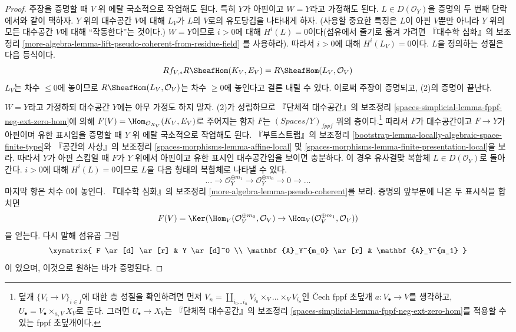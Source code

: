 \begin{proof}
\medskip\noindent
주장을 증명할 때 $V$ 위 에탈 국소적으로 작업해도 된다. 특히 $Y$가 아핀이고
$W = Y$라고 가정해도 된다. $L \in D(\mathcal{O}_Y)$을 증명의 두 번째 단락에서와
같이 택하자. $Y$ 위의 대수공간 $V$에 대해 $L_V$가 $L$의 $V$로의 유도당김을
나타내게 하자. (사용할 중요한 특징은 $L$이 아핀 $V$뿐만 아니라 $Y$ 위의
모든 대수공간 $V$에 대해 ``작동한다''는 것이다.) $W = Y$이므로
$i > 0$에 대해 $H^i(L) = 0$이다(섬유에서 줄기로 옮겨 가려면 『대수학 심화』의
보조정리
\ref{more-algebra-lemma-lift-pseudo-coherent-from-residue-field}
를 사용하라). 따라서 $i > 0$에 대해 $H^i(L_V) = 0$이다. $L$을 정의하는
성질은 다음 등식이다.
$$
Rf_{V, *}R\SheafHom(K_V, E_V) = R\SheafHom(L_V, \mathcal{O}_V)
$$
$L_V$는 차수 $\leq 0$에 놓이므로
$R\SheafHom(L_V, \mathcal{O}_V)$는 차수 $\geq 0$에 놓인다고 결론 내릴 수 있다.
이로써 주장이 증명되고, (2)의 증명이 끝난다.

\medskip\noindent
$W = Y$라고 가정하되 대수공간 $Y$에는 아무 가정도 하지 말자. (2)가
성립하므로 『단체적 대수공간』의 보조정리
\ref{spaces-simplicial-lemma-fppf-neg-ext-zero-hom}에 의해
$F(V) = \Hom_{\mathcal{O}_{X_V}}(K_V, E_V)$로 주어지는 함자 $F$는
$(\textit{Spaces}/Y)_{fppf}$ 위의 층이다.\footnote{덮개
$\{V_i \to V\}_{i \in I}$에 대한 층 성질을 확인하려면 먼저
$V_n = \coprod_{i_0 \ldots i_n} V_{i_0} \times_V \ldots \times_V V_{i_n}$인
{\v C}ech fppf 초덮개 $a : V_\bullet \to V$를 생각하고,
$U_\bullet = V_\bullet \times_{a, V} X_V$로 둔다. 그러면
$U_\bullet \to X_V$는 『단체적 대수공간』의 보조정리
\ref{spaces-simplicial-lemma-fppf-neg-ext-zero-hom}를 적용할 수 있는 fppf
초덮개이다.} 따라서 $F$가 대수공간이고 $F \to Y$가 아핀이며 유한 표시임을
증명할 때 $Y$ 위 에탈 국소적으로 작업해도 된다. 『부트스트랩』의 보조정리
\ref{bootstrap-lemma-locally-algebraic-space-finite-type}와 『공간의 사상』의
보조정리 \ref{spaces-morphisms-lemma-affine-local} 및
\ref{spaces-morphisms-lemma-finite-presentation-local}을 보라. 따라서 $Y$가
아핀 스킴일 때 $F$가 $Y$ 위에서 아핀이고 유한 표시인 대수공간임을 보이면
충분하다. 이 경우 유사결맞 복합체 $L \in D(\mathcal{O}_Y)$로 돌아간다.
$i > 0$에 대해 $H^i(L) = 0$이므로 $L$을 다음 형태의 복합체로 나타낼 수 있다.
$$
\ldots \to \mathcal{O}_Y^{\oplus m_1} \to \mathcal{O}_Y^{\oplus m_0}
\to 0 \to \ldots
$$
마지막 항은 차수 $0$에 놓인다. 『대수학 심화』의 보조정리
\ref{more-algebra-lemma-pseudo-coherent}를 보라. 증명의 앞부분에 나온 두
표시식을 합치면
$$
F(V) =
\Ker(
\Hom_V(\mathcal{O}_V^{\oplus m_0}, \mathcal{O}_V)
\to 
\Hom_V(\mathcal{O}_V^{\oplus m_1}, \mathcal{O}_V)
)
$$
을 얻는다. 다시 말해 섬유곱 그림
$$
\xymatrix{
F \ar[d] \ar[r] & Y \ar[d]^0 \\
\mathbf{A}_Y^{m_0} \ar[r] & \mathbf{A}_Y^{m_1}
}
$$
이 있으며, 이것으로 원하는 바가 증명된다.
\end{proof}


